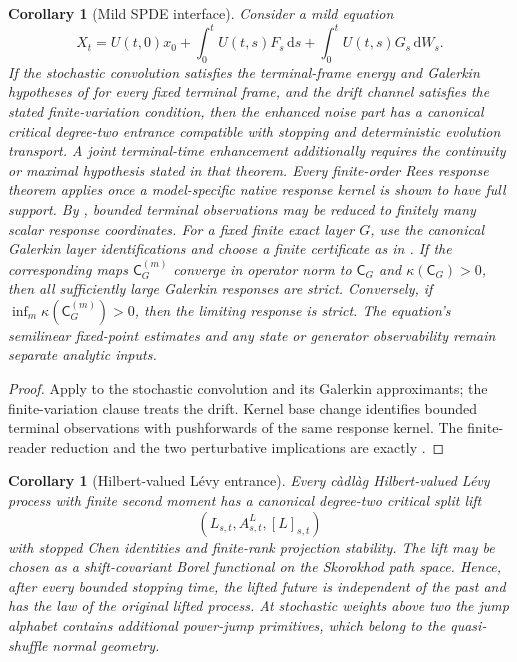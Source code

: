 \documentclass[10pt,reqno]{amsart}
\theoremstyle{plain}
\newtheorem{corollary}[theorem]{Corollary}
\theoremstyle{definition}
\theoremstyle{remark}
\begin{document}
\begin{corollary}[Mild SPDE interface]
\label{cor:mild-spde-interface}
Consider a mild equation
\[
 X_t=U(t,0)x_0+\int_0^tU(t,s)F_s\,\mathrm ds
      +\int_0^tU(t,s)G_s\,\mathrm dW_s.
\]
If the stochastic convolution satisfies the terminal-frame energy and
Galerkin hypotheses of  for every fixed
terminal frame, and the drift channel satisfies the stated finite-variation
condition, then the enhanced noise part has a canonical critical degree-two
entrance compatible with stopping and deterministic evolution transport.
A joint terminal-time enhancement additionally requires the continuity or
maximal hypothesis stated in that theorem.  Every finite-order Rees
response theorem applies once a model-specific native response kernel is
shown to have full support.  By
, bounded terminal
observations may be reduced to finitely many scalar response coordinates.
For a fixed finite exact layer $G$, use the canonical Galerkin layer
identifications and choose a finite certificate as in
.  If the corresponding maps
$\mathsf C_G^{(m)}$ converge in operator norm to $\mathsf C_G$ and
$\kappa(\mathsf C_G)>0$, then all sufficiently large Galerkin responses are
strict.  Conversely, if $\inf_m\kappa(\mathsf C_G^{(m)})>0$, then the limiting
response is strict.  The equation's semilinear fixed-point estimates and any
state or generator observability remain separate analytic inputs.
\end{corollary}

\begin{proof}
Apply  to the stochastic convolution and
its Galerkin approximants; the finite-variation clause treats the drift.
Kernel base change identifies bounded terminal observations with pushforwards
of the same response kernel.  The finite-reader reduction and the two
perturbative implications are exactly .
\end{proof}

\begin{corollary}[Hilbert-valued L\'evy entrance]
\label{cor:compact-levy-entrance}
Every c\`adl\`ag Hilbert-valued L\'evy process with finite second moment has a
canonical degree-two critical split lift
\[
 (L_{s,t},A^L_{s,t},[L]_{s,t})
\]
with stopped Chen identities and finite-rank projection stability.  The lift
may be chosen as a shift-covariant Borel functional on the Skorokhod path
space.  Hence, after every bounded stopping time, the lifted future is
independent of the past and has the law of the original lifted process.
At stochastic weights above two the jump alphabet contains additional
power-jump primitives, which belong to the quasi-shuffle normal geometry.
\end{corollary}
\end{document}
